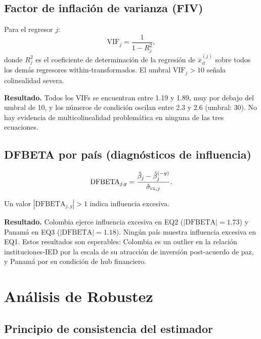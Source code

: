 \documentclass[12pt, a4paper]{article}
\theoremstyle{definition}
\begin{document}
\subsection{Factor de inflación de varianza (FIV)}

Para el regresor $j$:
\[
  \mathrm{VIF}_j = \frac{1}{1 - R^2_j},
\]
donde $R^2_j$ es el coeficiente de determinación de la regresión de $\ddot{x}^{(j)}_{it}$ sobre todos los demás regresores within-transformados. El umbral $\mathrm{VIF}_j > 10$ señala colinealidad severa.

\begin{resultbox}
\textbf{Resultado.} Todos los VIFs se encuentran entre 1.19 y 1.89, muy por debajo del umbral de 10, y los números de condición oscilan entre 2.3 y 2.6 (umbral: 30). No hay evidencia de multicolinealidad problemática en ninguna de las tres ecuaciones.
\end{resultbox}

\subsection{DFBETA por país (diagnósticos de influencia)}

\[
  \mathrm{DFBETA}_{j,g} = \frac{\hat\beta_j - \hat\beta_j^{(-g)}}{\hat\sigma_{\textsc{cl},j}}.
\]

Un valor $|\mathrm{DFBETA}_{j,g}| > 1$ indica influencia excesiva.

\begin{resultbox}
\textbf{Resultado.} Colombia ejerce influencia excesiva en EQ2 ($|\mathrm{DFBETA}| = 1.73$) y Panamá en EQ3 ($|\mathrm{DFBETA}| = 1.18$). Ningún país muestra influencia excesiva en EQ1. Estos resultados son esperables: Colombia es un outlier en la relación instituciones-IED por la escala de su atracción de inversión post-acuerdo de paz, y Panamá por su condición de hub financiero.
\end{resultbox}

\section{Análisis de Robustez}

\subsection{Principio de consistencia del estimador}
\end{document}
